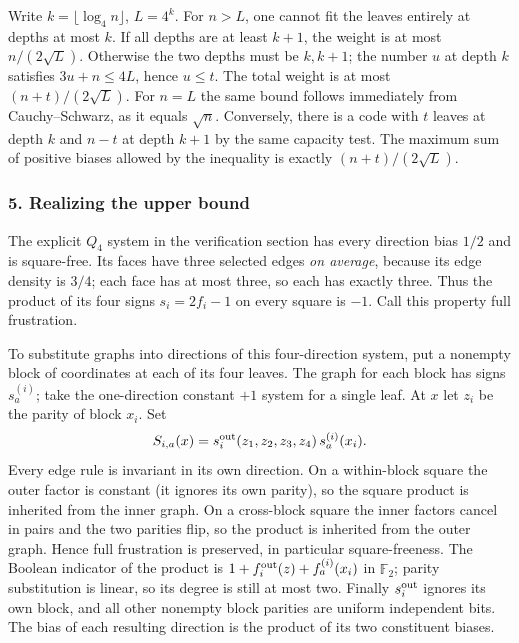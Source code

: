 \documentclass[
  10pt,
]{article}
\begin{document}
Write \(k=\lfloor\log_4 n\rfloor\), \(L=4^k\). For \(n>L\), one cannot
fit the leaves entirely at depths at most \(k\). If all depths are at
least \(k+1\), the weight is at most \(n/(2\sqrt L)\). Otherwise the two
depths must be \(k,k+1\); the number \(u\) at depth \(k\) satisfies
\(3u+n\le4L\), hence \(u\le t\). The total weight is at most
\((n+t)/(2\sqrt L)\). For \(n=L\) the same bound follows immediately
from Cauchy--Schwarz, as it equals \(\sqrt n\). Conversely, there is a
code with \(t\) leaves at depth \(k\) and \(n-t\) at depth \(k+1\) by
the same capacity test. The maximum sum of positive biases allowed by
the inequality is exactly \((n+t)/(2\sqrt L)\).

\subsubsection{5. Realizing the upper
bound}\label{realizing-the-upper-bound}

The explicit \(Q_4\) system in the verification section has every
direction bias \(1/2\) and is square-free. Its faces have three selected
edges \emph{on average}, because its edge density is \(3/4\); each face
has at most three, so each has exactly three. Thus the product of its
four signs \(s_i=2f_i-1\) on every square is \(-1\). Call this property
full frustration.

To substitute graphs into directions of this four-direction system, put
a nonempty block of coordinates at each of its four leaves. The graph
for each block has signs \(s_a^{(i)}\); take the one-direction constant
\(+1\) system for a single leaf. At \(x\) let \(z_i\) be the parity of
block \(x_i\). Set \[
S_{i,a}(x)=s_i^{\rm out}(z_1,z_2,z_3,z_4)\,s_a^{(i)}(x_i).
\] Every edge rule is invariant in its own direction. On a within-block
square the outer factor is constant (it ignores its own parity), so the
square product is inherited from the inner graph. On a cross-block
square the inner factors cancel in pairs and the two parities flip, so
the product is inherited from the outer graph. Hence full frustration is
preserved, in particular square-freeness. The Boolean indicator of the
product is \(1+f_i^{\rm out}(z)+f_a^{(i)}(x_i)\) in \(\mathbb F_2\);
parity substitution is linear, so its degree is still at most two.
Finally \(s_i^{\rm out}\) ignores its own block, and all other nonempty
block parities are uniform independent bits. The bias of each resulting
direction is the product of its two constituent biases.
\end{document}

